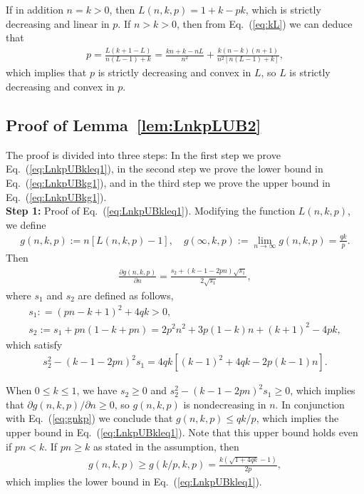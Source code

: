 \documentclass[aop]{imsart}
\theoremstyle{plain}
\theoremstyle{remark}
\newcommand{\1}{\operatorname{\uppercase\expandafter{\romannumeral1}}}
\newcommand{\2}{\operatorname{\uppercase\expandafter{\romannumeral2}}}
\newcommand{\3}{\operatorname{\uppercase\expandafter{\romannumeral3}}}
\newcommand{\4}{\operatorname{\uppercase\expandafter{\romannumeral4}}}
\newcommand{\5}{\operatorname{\uppercase\expandafter{\romannumeral5}}}
\newcommand{\6}{\operatorname{\uppercase\expandafter{\romannumeral6}}}
\newcommand{\7}{\operatorname{\uppercase\expandafter{\romannumeral7}}}
\newcommand{\8}{\operatorname{\uppercase\expandafter{\romannumeral8}}}
\newcommand{\9}{\operatorname{\uppercase\expandafter{\romannumeral9}}}
\newcommand{\eref}[1]{Eq.~\textup{(\ref{#1})}}
\newcommand{\lref}[1]{Lemma~\ref{#1}}
\begin{document}
\begin{appendix}
	If in addition $n=k>0$, then $L(n,k,p)=1+k-pk$, which is strictly decreasing and linear in $p$. 
	If  $n> k>0$, then 
	from \eref{eq:kL} we can deduce  that 
	\begin{align}
	p=\frac{L(k+1-L)}{n(L-1)+k}=\frac{kn+k-n L}{n^2}+\frac{k(n-k)(n+1)}{n^2[n(L-1)+k]},
	\end{align}
	which implies that $p$ is strictly decreasing and convex in $L$, so $L$ is strictly decreasing and convex  in $p$.
	
	

\subsection{Proof of \lref{lem:LnkpLUB2}} The proof is divided into three steps: In the first step we prove \eref{eq:LnkpUBkleq1}, in the second step we prove the lower bound in \eref{eq:LnkpUBkg1}, and in the third step we prove  the upper bound in \eref{eq:LnkpUBkg1}.\\


\textbf{Step 1:} Proof of \eref{eq:LnkpUBkleq1}. Modifying the function $L(n,k,p)$, we define
	\begin{gather}
	g(n,k,p):=n [L(n,k,p)-1],\quad 	g(\infty, k,p ):=\lim_{n\rightarrow \infty}g(n,k,p)=\frac{q k}{p}.\label{eq:gnkp}
	\end{gather}
	Then  
	\begin{gather}
	\frac{\partial g(n,k,p)}{\partial n}
	=\frac{s_2+(k-1-2p n)\sqrt{s_1}}{2\sqrt{s_1}},
	\end{gather}
	where $s_1$ and $s_2$ are defined as follows,
	\begin{gather}
	s_1: =(p n-k+1)^2+4q k>0,\\ 
      s_2:=s_1+p n(1-k+p n)= 2p^2 n^2 +3p(1-k)n+(k+1)^2-4p k, 
	\end{gather}
	which satisfy
		\begin{gather}
	s_2^2-(k-1-2p n)^2 s_1=4q k[(k-1)^2+4q k-2p(k-1)n]. 
	\end{gather}
	
	When $0\leq k\leq 1$, we have $s_2\geq 0$ and $s_2^2-(k-1-2p n)^2 s_1\geq 0$, which implies that $\partial g(n,k,p)/\partial n\geq 0$, so $g(n,k,p)$ is nondecreasing in $n$. In conjunction with \eref{eq:gnkp} we conclude that $g(n,k,p)\leq q k/p$, which implies  the upper bound in \eref{eq:LnkpUBkleq1}. Note that this upper bound holds even if $p n<k$. If $p n\geq k$ as stated in the assumption, then 
	\begin{align}
	g(n,k,p)\geq g(k/p, k,p)=\frac{k(\sqrt{1+4q k}-1)}{2p}, 
	\end{align}
	which implies  the lower  bound in \eref{eq:LnkpUBkleq1}.\\
	

\end{appendix}
\end{document}

